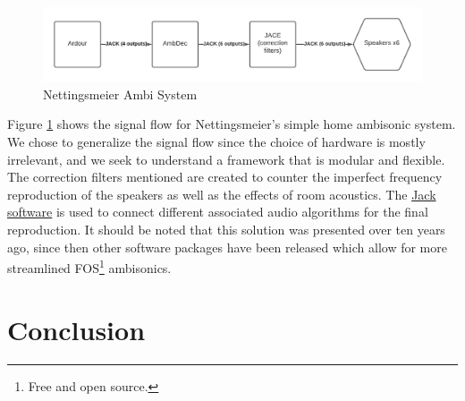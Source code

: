 \begin{figure}[ht]%
\centering
\includegraphics[width=1.0\textwidth]{img/nettingsmeier-extra-frontal.png} 
\caption{Nettingsmeier Ambi System}
\label{fig:extra-frontal}
\end{figure}

Figure \ref{fig:extra-frontal} shows the signal flow for Nettingsmeier's simple home ambisonic system. We chose to generalize the signal flow since the choice of hardware is mostly irrelevant, and we seek to understand a framework that is modular and flexible. The correction filters mentioned are created to counter the imperfect frequency reproduction of the speakers as well as the effects of room acoustics. The \href{https://jackaudio.org/}{Jack software} is used to connect different associated audio algorithms for the final reproduction. It should be noted that this solution was presented over ten years ago, since then other software packages have been released which allow for more streamlined FOS\footnote{Free and open source.} ambisonics. 


\section{Conclusion}